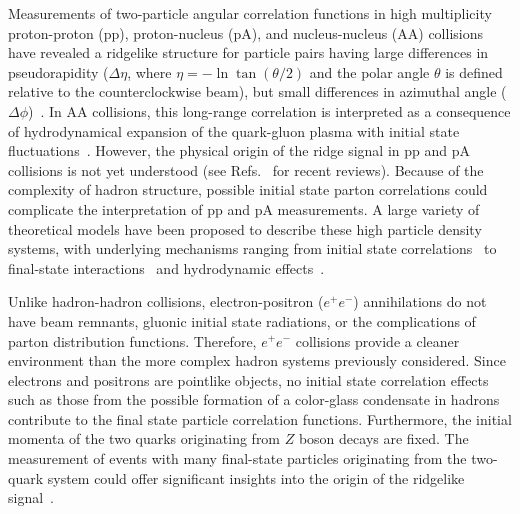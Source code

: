 \documentclass[aps,prl,twocolumn,superscriptaddress,groupedaddress]{revtex4}  %
\begin{document}
\maketitle

Measurements of two-particle angular correlation functions in high multiplicity proton-proton (pp), proton-nucleus (pA), and nucleus-nucleus (AA) collisions have revealed a ridgelike structure for particle pairs having large differences in pseudorapidity ($\Delta\eta$, where $\eta=-\ln{\tan{(\theta/2)}}$ and the polar angle $\theta$ is defined relative to the counterclockwise beam), but small differences in azimuthal angle ($\Delta\phi$)~\cite{Khachatryan:2010gv,Aad:2015gqa,CMS:2012qk,Abelev:2012ola,Aad:2012gla,Adare:2013piz,Chatrchyan:2012wg,Aaij:2015qcq}. In AA collisions, this long-range correlation is interpreted as a consequence of hydrodynamical expansion of the quark-gluon plasma with initial state fluctuations~\cite{Ollitrault:1992bk,Alver:2010gr}. However, the physical origin of the ridge signal in pp and pA collisions is not yet understood (see Refs.~\cite{Dusling:2015gta,Nagle:2018nvi} for recent reviews). Because of the complexity of hadron structure, possible initial state parton correlations could complicate the interpretation of pp and pA measurements. A large variety of theoretical models have been proposed to describe these high particle density systems, with underlying mechanisms ranging from initial state correlations~\cite{Dusling:2013qoz} to final-state interactions~\cite{He:2015hfa} and hydrodynamic effects~\cite{Bozek:2011if}. 

Unlike hadron-hadron collisions, electron-positron ($e^+e^-$) annihilations do not have beam remnants, gluonic initial state radiations, or the complications of parton distribution functions. Therefore, $e^+e^-$ collisions provide a cleaner environment than the more complex hadron systems previously considered. Since electrons and positrons are pointlike objects, no initial state correlation effects such as those from the possible formation of a color-glass condensate in hadrons contribute to the final state particle correlation functions. Furthermore, the initial momenta of the two quarks originating from $Z$ boson decays are fixed. The measurement of events with many final-state particles originating from the two-quark system could offer significant insights into the origin of the ridgelike signal~\cite{Nagle:2017sjv}.
\end{document}
